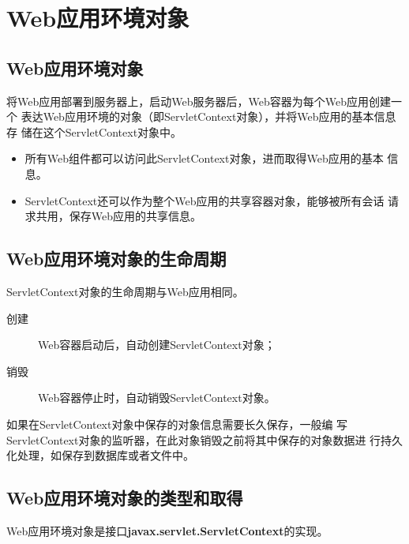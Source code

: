 \section{Web应用环境对象}

\subsection{Web应用环境对象} 

将Web应用部署到服务器上，启动Web服务器后，Web容器为每个Web应用创建一个
表达Web应用环境的对象（即ServletContext对象），并将Web应用的基本信息存
储在这个ServletContext对象中。


\begin{itemize}\kai
\item 所有Web组件都可以访问此ServletContext对象，进而取得Web应用的基本
  信息。
\item ServletContext还可以作为整个Web应用的共享容器对象，能够被所有会话
  请求共用，保存Web应用的共享信息。
\end{itemize}


\subsection{Web应用环境对象的生命周期} 

ServletContext对象的生命周期与Web应用相同。

\begin{description}
\item[创建] Web容器启动后，自动创建ServletContext对象；
\item[销毁] Web容器停止时，自动销毁ServletContext对象。
\end{description}

  

{\kai 如果在ServletContext对象中保存的对象信息需要长久保存，一般编
  写ServletContext对象的监听器，在此对象销毁之前将其中保存的对象数据进
  行持久化处理，如保存到数据库或者文件中。}

\subsection{Web应用环境对象的类型和取得} 

Web应用环境对象是接口{\bf\Blue javax.servlet.ServletContext}的实现。


